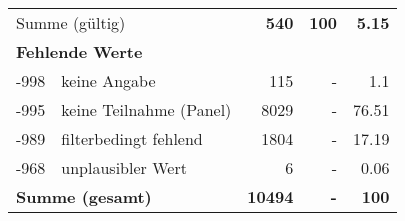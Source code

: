 \begin{longtable}{lXrrr}
     \midrule
     \multicolumn{2}{l}{Summe (gültig)} &
       \textbf{\num{540}} &
     \textbf{100} &
       \textbf{\num[round-mode=places,round-precision=2]{5,15}} \\
     \multicolumn{5}{l}{\textbf{Fehlende Werte}}\\
       -998 &
       keine Angabe &
         \num{115} &
        - &
         \num[round-mode=places,round-precision=2]{1,1} \\
       -995 &
       keine Teilnahme (Panel) &
         \num{8029} &
        - &
         \num[round-mode=places,round-precision=2]{76,51} \\
       -989 &
       filterbedingt fehlend &
         \num{1804} &
        - &
         \num[round-mode=places,round-precision=2]{17,19} \\
       -968 &
       unplausibler Wert &
         \num{6} &
        - &
         \num[round-mode=places,round-precision=2]{0,06} \\
     \midrule
     \multicolumn{2}{l}{\textbf{Summe (gesamt)}} &
          \textbf{\num{10494}} &
        \textbf{-} &
        \textbf{100} \\
     \bottomrule
     \end{longtable}
     
